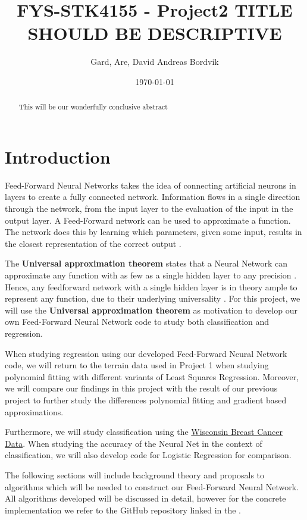 \documentclass[11pt, a4paper]{article}
\title{FYS-STK4155 - Project2 TITLE SHOULD BE DESCRIPTIVE}
\author{Gard, Are, David Andreas Bordvik}
\date{\today}
\begin{document}
\maketitle
\begin{abstract}
  This will be our wonderfully conclusive abstract
\end{abstract}

\section*{Introduction}
Feed-Forward Neural Networks takes the idea of connecting artificial neurons in layers to create a fully connected network. Information flows in a single direction through the network, from the input layer to the evaluation of the input in the output layer. A Feed-Forward network can be used to approximate a function. The network does this by learning which parameters, given some input, results in the closest representation of the correct output \cite{Goodfellow2016}.

The \textbf{Universal approximation theorem} states that a Neural Network can approximate any function with as few as a single hidden layer to any precision \cite{Hornik1989, Cybenko1989}. Hence, any feedforward network with a single hidden layer is in theory ample to represent any function, due to their underlying universality \cite{Nielsen2015}. For this project, we will use the \textbf{Universal approximation theorem} as motivation to develop our own Feed-Forward Neural Network code to study both classification and regression.

When studying regression using our developed Feed-Forward Neural Network code, we will return to the terrain data used in Project 1 when studying polynomial fitting with different variants of Least Squares Regression. Moreover, we will compare our findings in this project with the result of our previous project to further study the differences polynomial fitting and gradient based approximations. 

Furthermore, we will study classification using the \href{https://www.kaggle.com/uciml/breast-cancer-wisconsin-data}{Wisconsin Breast Cancer Data}. When studying the accuracy of the Neural Net in the context of classification, we will also develop code for Logistic Regression for comparison.

The following sections will include background theory and proposals to algorithms which will be needed to construct our Feed-Forward Neural Network. All algorithms developed will be discussed in detail, however for the concrete implementation we refer to the GitHub repository linked in the .
\end{document}
